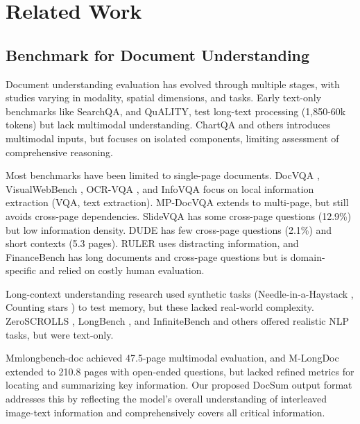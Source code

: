 \section{Related Work}

\subsection{Benchmark for Document Understanding}
Document understanding evaluation has evolved through multiple stages, with studies varying in modality, spatial dimensions, and tasks. Early text-only benchmarks \cite{searchqa_s7, question_s9} like SearchQA, and QuALITY, test long-text processing (1,850-60k tokens) but lack multimodal understanding. ChartQA \cite{chartqa_s15} and others \cite{towards_s28, visualwebbench_s29} 
introduces multimodal inputs, but focuses on isolated components, limiting assessment of comprehensive reasoning.

Most benchmarks have been limited to single-page documents. DocVQA \cite{docvqa_s13}, VisualWebBench \cite{visualwebbench_s29}, OCR-VQA \cite{ocrvqa_s16}, and InfoVQA \cite{infographicvqa_s17} focus on local information extraction (VQA, text extraction). MP-DocVQA \cite{mmlongbench_s36} extends to multi-page, but still avoids cross-page dependencies. SlideVQA \cite{slidevqa_s32} has some cross-page questions (12.9\%) but low information density. DUDE \cite{document_s31} has few cross-page questions (2.1\%) and short contexts (5.3 pages). RULER \cite{ruler_s24} uses distracting information, and FinanceBench \cite{financebench_s34} has long documents and cross-page questions but is domain-specific and relied on costly human evaluation.

Long-context understanding research used synthetic tasks (Needle-in-a-Haystack \cite{needle_s22}, Counting stars \cite{counting_s23}) to test memory, but these lacked real-world complexity. ZeroSCROLLS \cite{zeroscrolls_s1}, LongBench \cite{longbench_s3}, and InfiniteBench \cite{infinite_s4} and others \cite{loogle_s6, marathon_s25} 
offered realistic NLP tasks, but were text-only.

Mmlongbench-doc \cite{mmlongbench_s36} achieved 47.5-page multimodal evaluation, and M-LongDoc \cite{mlongdoc_s14} extended to 210.8 pages with open-ended questions, but lacked refined metrics for locating and summarizing key information. Our proposed DocSum output format addresses this by reflecting the model's overall understanding of interleaved image-text information and comprehensively covers all critical information.

